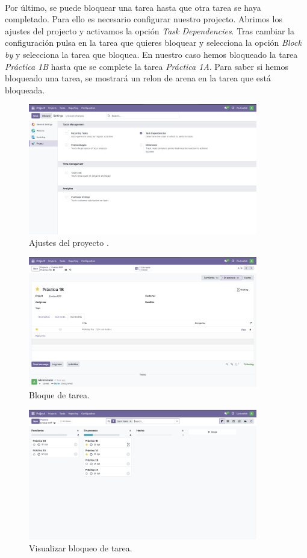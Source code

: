 \documentclass[paper=a4wide, fontsize=11pt]{report}	 %
\begin{document}
\paragraph{}
Por último, se puede bloquear una tarea hasta que otra tarea se haya completado. Para ello es necesario configurar nuestro projecto. Abrimos los ajustes del projecto y activamos la opción \textit{Task Dependencies}. Tras cambiar la configuración pulsa en la tarea que quieres bloquear y selecciona la opción \textit{Block by} y selecciona la tarea que bloquea. En nuestro caso hemos bloqueado la tarea \textit{Práctica 1B} hasta que se complete la tarea \textit{Práctica 1A}. Para saber si hemos bloqueado una tarea, se mostrará un relon de arena en la tarea que está bloqueada.
\begin{figure}[h]
    \centering
    \includegraphics[width=10cm]{settingsProject.png}
    \caption{Ajustes del proyecto .}
    \label{fig:openProyectos}
\end{figure}
\begin{figure}[h]
    \centering
    \includegraphics[width=10cm]{blockTaskProject.png}
    \caption{Bloque de tarea.}
    \label{fig:openProyectos}
\end{figure}
\begin{figure}[h]
    \centering
    \includegraphics[width=10cm]{viewBlockProject.png}
    \caption{Visualizar bloqueo de tarea.}
    \label{fig:openProyectos}
\end{figure}
\end{document}
